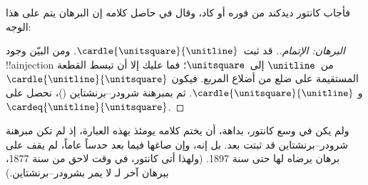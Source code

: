 \documentclass[../../../include/open-logic-section]{subfiles}
\begin{document}
فأجاب كانتور ديدكند من فوره أو كاد، وقال في حاصل كلامه إن البرهان يتم على
هذا الوجه:

\begin{proof}[البرهان: الإتمام.]
قد ثبت~$\cardle{\unitsquare}{\unitline}$. ومن البيّن وجود !!a{injection}
من~$\unitline$ إلى~$\unitsquare$؛ فما عليك إلا أن تبسط القطعة المستقيمة
على ضلع من أضلاع المربع. فيكون
$\cardle{\unitline}{\unitsquare}$ و
$\cardle{\unitsquare}{\unitline}$. ثم بمبرهنة شرودر--برنشتاين
()، نحصل على
$\cardeq{\unitline}{\unitsquare}$.
\end{proof}

ولم يكن في وسع كانتور، بداهة، أن يختم كلامه يومئذ بهذه العبارة، إذ لم تكن
مبرهنة شرودر--برنشتاين قد ثبتت بعد. بل إنه، وإن صاغها فيما بعد حدساً
عاماً، لم يقف على برهان يرضاه لها حتى سنة 1897. (ولهذا أتى كانتور، في
وقت لاحق من سنة 1877، ببرهان آخر لـ لا يمر
بشرودر--برنشتاين.)
\end{document}
